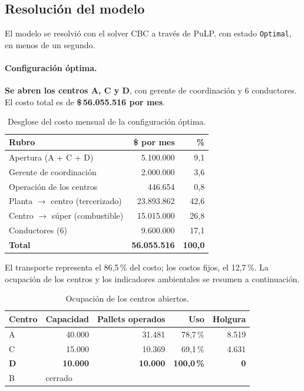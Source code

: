 \documentclass[10pt,a4paper]{article}
\newcommand{\cuello}[1]{\textbf{\textcolor{limita}{#1}}}
\begin{document}
\subsection{Resolución del modelo}
\label{sec:resolucion}

El modelo se resolvió con el solver CBC a través de PuLP, con estado
\texttt{Optimal}, en menos de un segundo.

\paragraph{Configuración óptima.} \textbf{Se abren los centros A, C y D}, con
gerente de coordinación y 6 conductores. El costo total es de
\textbf{\$\,56.055.516 por mes}.

\begin{table}[H]
\centering\small
\caption{Desglose del costo mensual de la configuración óptima.}
\label{tab:desglose}
\begin{tabular}{lrr}
\toprule
\textbf{Rubro} & \textbf{\$ por mes} & \textbf{\%} \\
\midrule
Apertura (A + C + D)                     & 5.100.000  & 9,1 \\
Gerente de coordinación                  & 2.000.000  & 3,6 \\
Operación de los centros                 & 446.654    & 0,8 \\
Planta $\to$ centro (tercerizado)        & 23.893.862 & 42,6 \\
Centro $\to$ súper (combustible)         & 15.015.000 & 26,8 \\
Conductores (6)                          & 9.600.000  & 17,1 \\
\midrule
\textbf{Total}                           & \textbf{56.055.516} & \textbf{100,0} \\
\bottomrule
\end{tabular}
\end{table}

El transporte representa el 86,5\,\% del costo; los costos fijos, el 12,7\,\%.
La ocupación de los centros y los indicadores ambientales se resumen a
continuación.

\begin{table}[H]
\centering\small
\caption{Ocupación de los centros abiertos.}
\label{tab:ocupacion}
\begin{tabular}{lrrrr}
\toprule
\textbf{Centro} & \textbf{Capacidad} & \textbf{Pallets operados} & \textbf{Uso} & \textbf{Holgura} \\
\midrule
A & 40.000 & 31.481 & 78,7\,\% & 8.519 \\
C & 15.000 & 10.369 & 69,1\,\% & 4.631 \\
\cuello{D} & \cuello{10.000} & \cuello{10.000} & \cuello{100,0\,\%} & \cuello{0} \\
B & \multicolumn{4}{l}{cerrado} \\
\bottomrule
\end{tabular}
\end{table}
\end{document}

